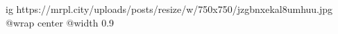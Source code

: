  
 
 
 
 

\ifcmt
  ig https://mrpl.city/uploads/posts/resize/w/750x750/jzgbnxekal8umhuu.jpg
  @wrap center
  @width 0.9
\fi
